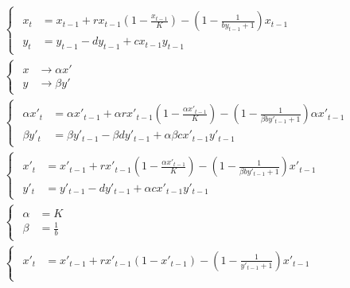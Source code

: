 \documentclass{article}
\begin{document}
	\begin{align}
		&\begin{cases}
			\begin{aligned}
				x_t &= x_{t-1} + r x_{t-1} \left(1 - \frac{x_{t-1}}{K}\right)
				- \left(1 - \frac{1}{b y_{t-1}+1}\right)x_{t-1} \\
				y_t &= y_{t-1} - d y_{t-1} + c x_{t-1} y_{t-1}
			\end{aligned}
		\end{cases}
		\\[1em]
		&\begin{cases}
			\begin{aligned}
				x &\rightarrow \alpha x' \\
				y &\rightarrow \beta y'
			\end{aligned}
		\end{cases}
		\\[1em]
		&\begin{cases}
			\begin{aligned}
				\alpha x'_t &= \alpha x'_{t-1} + \alpha r x'_{t-1} \left(1 - \frac{\alpha x'_{t-1}}{K}\right)
				- \left(1 - \frac{1}{\beta b y'_{t-1}+1}\right)\alpha x'_{t-1} \\
				\beta y'_t &= \beta y'_{t-1} - \beta d y'_{t-1} + \alpha \beta c x'_{t-1} y'_{t-1}
			\end{aligned}
		\end{cases}
		\\[1em]
		&\begin{cases}
			\begin{aligned}
				x'_t &= x'_{t-1} + r x'_{t-1} \left(1 - \frac{\alpha x'_{t-1}}{K}\right)
				- \left(1 - \frac{1}{\beta b y'_{t-1}+1}\right) x'_{t-1} \\
				y'_t &= y'_{t-1} -  d y'_{t-1} + \alpha c x'_{t-1} y'_{t-1}
			\end{aligned}
		\end{cases}
		\\[1em]
		&\begin{cases}
			\begin{aligned}
				\alpha &= K \\
				\beta &= \frac{1}{b}
			\end{aligned}
		\end{cases}
		\\[1em]
		&\begin{cases}
			\begin{aligned}
				x'_t &= x'_{t-1} + rx'_{t-1} (1 - x'_{t-1}) - \left( 1 - \frac{1}{y'_{t-1}+1} \right) x'_{t-1} \\

\end{aligned}
\end{cases}
\end{align}
\end{document}
